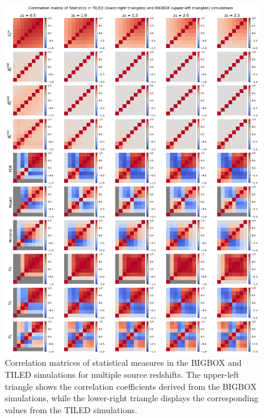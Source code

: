 \begin{figure}[p]
    \centering
    \includegraphics[width=\textwidth]{figures/results/corr_main.png}
    \caption[Correlation Matrices of Statistical Measures in BIGBOX and TILED Simulations]{Correlation matrices of statistical measures in the BIGBOX and TILED simulations for multiple source redshifts. The upper-left triangle shows the correlation coefficients derived from the BIGBOX simulations, while the lower-right triangle displays the corresponding values from the TILED simulations.}
    \label{fig:corr_main}
\end{figure}

